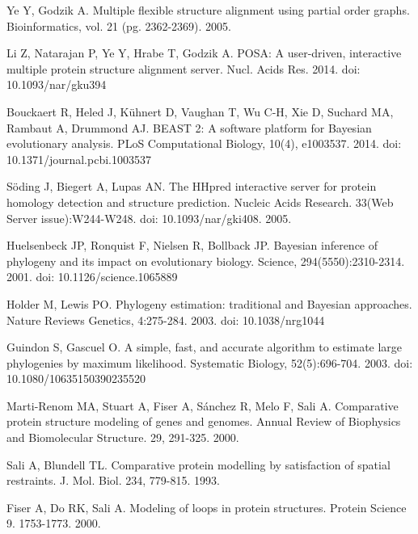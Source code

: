 \documentclass[10pt,letterpaper]{article}
\begin{document}
\begin{thebibliography}{10}
Ye Y, Godzik A.
\newblock Multiple flexible structure alignment using partial order graphs.
\newblock Bioinformatics, vol. 21 (pg. 2362-2369). 2005.

Li Z, Natarajan P, Ye Y, Hrabe T, Godzik A.
\newblock POSA: A user-driven, interactive multiple protein structure alignment server.
\newblock Nucl. Acids Res. 2014. doi: 10.1093/nar/gku394

Bouckaert R, Heled J, Kühnert D, Vaughan T, Wu C-H, Xie D, Suchard MA, Rambaut A, Drummond AJ.
\newblock BEAST 2: A software platform for Bayesian evolutionary analysis.
\newblock PLoS Computational Biology, 10(4), e1003537. 2014. doi: 10.1371/journal.pcbi.1003537

Söding J, Biegert A, Lupas AN.
\newblock The HHpred interactive server for protein homology detection and structure prediction. 
\newblock Nucleic Acids Research. 33(Web Server issue):W244-W248. doi: 10.1093/nar/gki408. 2005.

Huelsenbeck JP, Ronquist F, Nielsen R, Bollback JP.
\newblock Bayesian inference of phylogeny and its impact on evolutionary biology.
\newblock Science, 294(5550):2310-2314. 2001. doi: 10.1126/science.1065889

Holder M, Lewis PO.
\newblock Phylogeny estimation: traditional and Bayesian approaches.
\newblock Nature Reviews Genetics, 4:275-284. 2003. doi: 10.1038/nrg1044

Guindon S, Gascuel O.
\newblock A simple, fast, and accurate algorithm to estimate large phylogenies by maximum likelihood.
\newblock Systematic Biology, 52(5):696-704. 2003. doi: 10.1080/10635150390235520

% 
Marti-Renom MA, Stuart A, Fiser A, Sánchez R, Melo F, Sali A. 
\newblock Comparative protein structure modeling of genes and genomes.
\newblock Annual Review of Biophysics and Biomolecular Structure. 29, 291-325. 2000.

%
Sali A, Blundell TL.
\newblock Comparative protein modelling by satisfaction of spatial restraints.
\newblock J. Mol. Biol. 234, 779-815. 1993.

% 
Fiser A, Do RK, Sali A.
\newblock Modeling of loops in protein structures.
\newblock Protein Science 9. 1753-1773. 2000.


\end{thebibliography}
\end{document}
